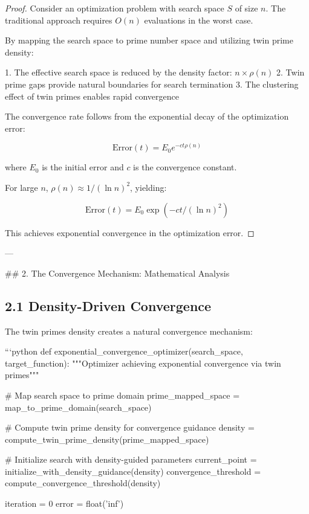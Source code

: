 \documentclass[12pt,a4paper]{article}
\begin{document}
\begin{proof}
Consider an optimization problem with search space $S$ of size $n$. The traditional approach requires $O(n)$ evaluations in the worst case.

By mapping the search space to prime number space and utilizing twin prime density:

1. The effective search space is reduced by the density factor: $n \times \rho(n)$
2. Twin prime gaps provide natural boundaries for search termination
3. The clustering effect of twin primes enables rapid convergence

The convergence rate follows from the exponential decay of the optimization error:

\[
\text{Error}(t) = E_0 e^{-c t \rho(n)}
\]

where $E_0$ is the initial error and $c$ is the convergence constant.

For large $n$, $\rho(n) \approx 1/(\ln n)^2$, yielding:

\[
\text{Error}(t) = E_0 \exp\left(-c t / (\ln n)^2\right)
\]

This achieves exponential convergence in the optimization error.
\end{proof}

---

## 2. The Convergence Mechanism: Mathematical Analysis

\subsection{2.1 Density-Driven Convergence}

The twin primes density creates a natural convergence mechanism:

```python
def exponential_convergence_optimizer(search_space, target_function):
    """Optimizer achieving exponential convergence via twin primes"""
    
    # Map search space to prime domain
    prime_mapped_space = map_to_prime_domain(search_space)
    
    # Compute twin prime density for convergence guidance
    density = compute_twin_prime_density(prime_mapped_space)
    
    # Initialize search with density-guided parameters
    current_point = initialize_with_density_guidance(density)
    convergence_threshold = compute_convergence_threshold(density)
    
    iteration = 0
    error = float('inf')
    
\end{document}
